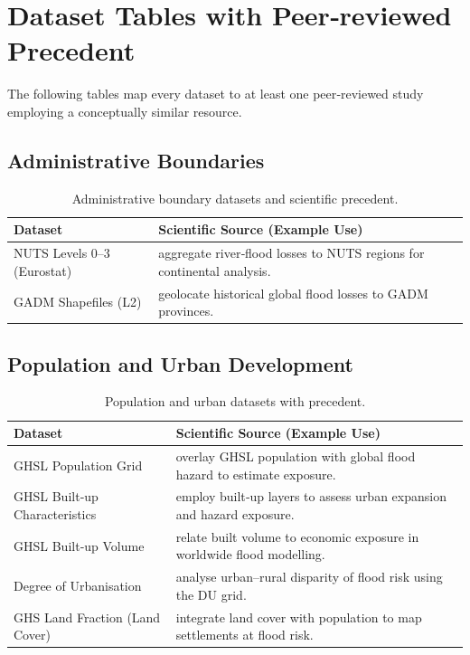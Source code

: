 \documentclass[a4paper,11pt]{article}
\begin{document}
\section{Dataset Tables with Peer‑reviewed Precedent}
The following tables map every dataset to at least one peer‑reviewed study employing a conceptually similar resource.

\subsection{Administrative Boundaries}
\begin{table}[H]
\centering
\caption{Administrative boundary datasets and scientific precedent.}
\label{tab:admin}
\begin{tabularx}{\textwidth}{@{}l X@{}}
\toprule
\textbf{Dataset} & \textbf{Scientific Source (Example Use)} \\ \midrule
NUTS Levels 0–3 (Eurostat) & \citet{Alfieri2016} aggregate river‑flood losses to NUTS regions for continental analysis. \\ 
GADM Shapefiles (L2) & \citet{DeMoel2015} geolocate historical global flood losses to GADM provinces. \\ \bottomrule
\end{tabularx}
\end{table}

\subsection{Population and Urban Development}
\begin{table}[H]
\centering
\caption{Population and urban datasets with precedent.}
\label{tab:pop}
\begin{tabularx}{\textwidth}{@{}l X@{}}
\toprule
\textbf{Dataset} & \textbf{Scientific Source (Example Use)} \\ \midrule
GHSL Population Grid & \citet{Freire2019} overlay GHSL population with global flood hazard to estimate exposure. \\ 
GHSL Built‑up Characteristics & \citet{Pesaresi2016} employ built‑up layers to assess urban expansion and hazard exposure. \\ 
GHSL Built‑up Volume & \citet{Hu2020} relate built volume to economic exposure in worldwide flood modelling. \\ 
Degree of Urbanisation & \citet{Tian2021} analyse urban–rural disparity of flood risk using the DU grid. \\ 
GHS Land Fraction (Land Cover) & \citet{Dottori2022} integrate land cover with population to map settlements at flood risk. \\ \bottomrule
\end{tabularx}
\end{table}
\end{document}

